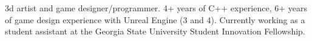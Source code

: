 

\begin{cvparagraph}

3d artist and game designer/programmer. 4+ years of C++ experience, 6+ years of
game design experience with Unreal Engine (3 and 4). Currently working as a 
student assistant at the Georgia State University Student Innovation Fellowship.
\end{cvparagraph}
